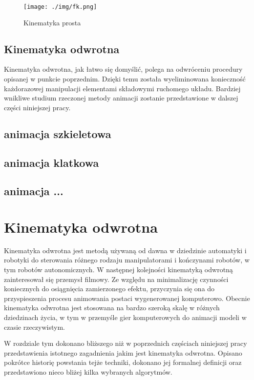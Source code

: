 \documentclass[11pt]{mwrep}
\begin{document}
\begin{figure}
 \centering
  \texttt{[image: ./img/fk.png]}
 \caption{Kinematyka prosta}
 \label{img:fk}
\end{figure}

\section{Kinematyka odwrotna}

 Kinematyka odwrotna, jak łatwo się domyślić, polega na odwróceniu procedury opisanej w punkcie poprzednim. Dzięki temu została wyeliminowana konieczność każdorazowej manipulacji elementami składowymi ruchomego układu. Bardziej wnikliwe studium rzeczonej metody animacji zostanie przedstawione w dalszej części niniejszej pracy.

  \section{animacja szkieletowa}
  \section{animacja klatkowa}
  \section{animacja ...}
  
\chapter{Kinematyka odwrotna}

 Kinematyka odwrotna jest metodą używaną od dawna w dziedzinie automatyki i robotyki do sterowania różnego rodzaju manipulatorami i kończynami robotów, w tym robotów autonomicznych. W następnej kolejności kinematyką odwrotną zainteresował się przemysł filmowy. Ze względu na minimalizację czynności koniecznych do osiągnięcia zamierzonego efektu, przyczynia się ona do przyspieszenia procesu animowania postaci wygenerowanej komputerowo. Obecnie kinematyka odwrotna jest stosowana na bardzo szeroką skalę w różnych dziedzinach życia, w tym w przemyśle gier komputerowych do animacji modeli w czasie rzeczywistym.
 
 W rozdziale tym dokonano bliższego niż w poprzednich częściach niniejszej pracy przedstawienia istotnego zagadnienia jakim jest kinematyka odwrotna. Opisano pokrótce historię powstania tejże techniki, dokonano jej formalnej definicji oraz przedstawiono nieco bliżej kilka wybranych algorytmów.
\end{document}
